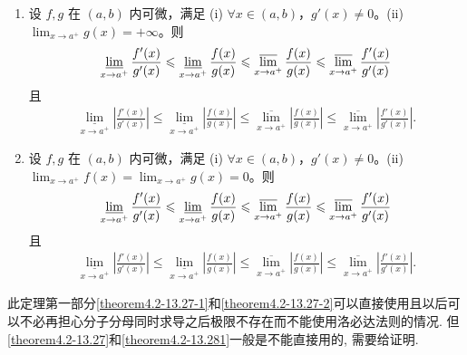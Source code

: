 \documentclass[../../main.tex]{subfiles}
\begin{document}
\begin{theorem}\label{theorem:上下极限L'Hospital法则}
\begin{enumerate}
\item 设 \(f, g\) 在 \((a,b)\) 内可微，满足 (i) \(\forall x \in (a,b)\)，\(g'(x) \ne 0\)。(ii) \(\lim_{x \to a^+} g(x) = +\infty\)。则
\begin{align}
\varliminf_{x \to a^+} \frac{f'(x)}{g'(x)} \leqslant \varliminf_{x \to a^+} \frac{f(x)}{g(x)} \leqslant \varlimsup_{x \to a^+} \frac{f(x)}{g(x)} \leqslant \varlimsup_{x \to a^+} \frac{f'(x)}{g'(x)}\label{theorem4.2-13.27-1}
\end{align}
且
\begin{align}\label{theorem4.2-13.27}
\underset{x\rightarrow a^+}{\underline{\lim }}\left| \frac{f' \left( x \right)}{g' \left( x \right)} \right|\leqslant \underset{x\rightarrow a^+}{\underline{\lim }}\left| \frac{f\left( x \right)}{g\left( x \right)} \right|\leqslant \underset{x\rightarrow a^+}{\overline{\lim }}\left| \frac{f\left( x \right)}{g\left( x \right)} \right|\leqslant \underset{x\rightarrow a^+}{\overline{\lim }}\left| \frac{f' \left( x \right)}{g' \left( x \right)} \right|.
\end{align}


\item 设 \(f, g\) 在 \((a,b)\) 内可微，满足 (i) \(\forall x \in (a,b)\)，\(g'(x) \ne 0\)。(ii) \(\lim_{x \to a^+} f(x) = \lim_{x \to a^+} g(x) = 0\)。则
\begin{align}\label{theorem4.2-13.27-2}
\varliminf_{x \to a^+} \frac{f'(x)}{g'(x)} \leqslant \varliminf_{x \to a^+} \frac{f(x)}{g(x)} \leqslant \varlimsup_{x \to a^+} \frac{f(x)}{g(x)} \leqslant \varlimsup_{x \to a^+} \frac{f'(x)}{g'(x)}
\end{align}
且
\begin{align}\label{theorem4.2-13.281}
\underset{x\rightarrow a^+}{\underline{\lim }}\left| \frac{f' \left( x \right)}{g' \left( x \right)} \right|\leqslant \underset{x\rightarrow a^+}{\underline{\lim }}\left| \frac{f\left( x \right)}{g\left( x \right)} \right|\leqslant \underset{x\rightarrow a^+}{\overline{\lim }}\left| \frac{f\left( x \right)}{g\left( x \right)} \right|\leqslant \underset{x\rightarrow a^+}{\overline{\lim }}\left| \frac{f' \left( x \right)}{g' \left( x \right)} \right|.
\end{align}
\end{enumerate}
\end{theorem}
\begin{note}
此定理第一部分\eqref{theorem4.2-13.27-1}和\eqref{theorem4.2-13.27-2}可以直接使用且以后可以不必再担心分子分母同时求导之后极限不存在而不能使用洛必达法则的情况. 但\eqref{theorem4.2-13.27}和\eqref{theorem4.2-13.281}一般是不能直接用的, 需要给证明.
\end{note}
\end{document}
